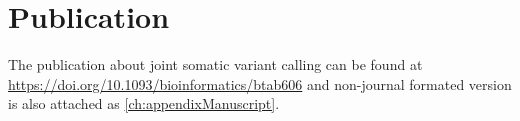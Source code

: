 \section{Publication}
The publication about joint somatic variant calling can be found at \href{https://doi.org/10.1093/bioinformatics/btab606}{https://doi.org/10.1093/bioinformatics/btab606} and non-journal formated version is also attached as \autoref{ch:appendixManuscript}.